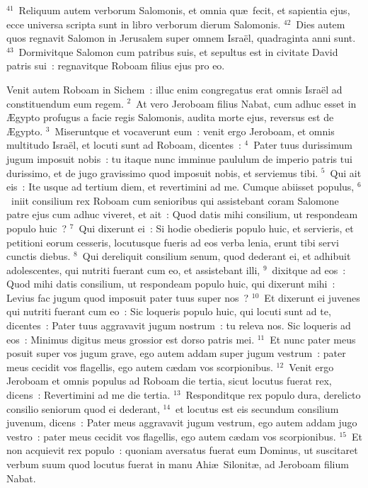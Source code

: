 ${}^{41}$~Reliquum autem verborum Salomonis, et omnia qu\ae\ fecit, et sapientia ejus, ecce universa scripta sunt in libro verborum dierum Salomonis.
${}^{42}$~Dies autem quos regnavit Salomon in Jerusalem super omnem Isra\"el, quadraginta anni sunt.
${}^{43}$~Dormivitque Salomon cum patribus suis, et sepultus est in civitate David patris sui~: regnavitque Roboam filius ejus pro eo.

\lettrine[lines=10,image=true,loversize=0.05,lraise=-0.03]{V}{}enit autem Roboam in Sichem~: illuc enim congregatus erat omnis Isra\"el ad constituendum eum regem.
${}^{2}$~At vero Jeroboam filius Nabat, cum adhuc esset in \AE gypto profugus a facie regis Salomonis, audita morte ejus, reversus est de \AE gypto.
${}^{3}$~Miseruntque et vocaverunt eum~: venit ergo Jeroboam, et omnis multitudo Isra\"el, et locuti sunt ad Roboam, dicentes~:
${}^{4}$~Pater tuus durissimum jugum imposuit nobis~: tu itaque nunc imminue paululum de imperio patris tui durissimo, et de jugo gravissimo quod imposuit nobis, et serviemus tibi.
${}^{5}$~Qui ait eis~: Ite usque ad tertium diem, et revertimini ad me. Cumque abiisset populus,
${}^{6}$~iniit consilium rex Roboam cum senioribus qui assistebant coram Salomone patre ejus cum adhuc viveret, et ait~: Quod datis mihi consilium, ut respondeam populo huic~?
${}^{7}$~Qui dixerunt ei~: Si hodie obedieris populo huic, et servieris, et petitioni eorum cesseris, locutusque fueris ad eos verba lenia, erunt tibi servi cunctis diebus.
${}^{8}$~Qui dereliquit consilium senum, quod dederant ei, et adhibuit adolescentes, qui nutriti fuerant cum eo, et assistebant illi,
${}^{9}$~dixitque ad eos~: Quod mihi datis consilium, ut respondeam populo huic, qui dixerunt mihi~: Levius fac jugum quod imposuit pater tuus super nos~?
${}^{10}$~Et dixerunt ei juvenes qui nutriti fuerant cum eo~: Sic loqueris populo huic, qui locuti sunt ad te, dicentes~: Pater tuus aggravavit jugum nostrum~: tu releva nos. Sic loqueris ad eos~: Minimus digitus meus grossior est dorso patris mei.
${}^{11}$~Et nunc pater meus posuit super vos jugum grave, ego autem addam super jugum vestrum~: pater meus cecidit vos flagellis, ego autem c\ae dam vos scorpionibus.
${}^{12}$~Venit ergo Jeroboam et omnis populus ad Roboam die tertia, sicut locutus fuerat rex, dicens~: Revertimini ad me die tertia.
${}^{13}$~Responditque rex populo dura, derelicto consilio seniorum quod ei dederant,
${}^{14}$~et locutus est eis secundum consilium juvenum, dicens~: Pater meus aggravavit jugum vestrum, ego autem addam jugo vestro~: pater meus cecidit vos flagellis, ego autem c\ae dam vos scorpionibus.
${}^{15}$~Et non acquievit rex populo~: quoniam aversatus fuerat eum Dominus, ut suscitaret verbum suum quod locutus fuerat in manu Ahi\ae\ Silonit\ae , ad Jeroboam filium Nabat.


